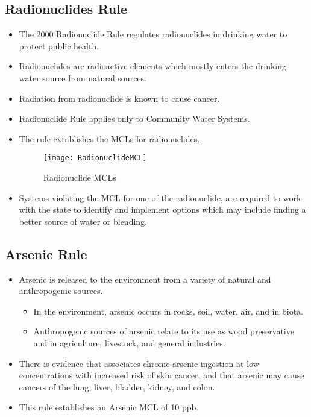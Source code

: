 \subsection{Radionuclides Rule}
\begin{itemize}
\item The 2000 Radionuclide Rule regulates radionuclides in drinking water to protect public health. 
\item Radionuclides are radioactive elements which mostly enters the drinking water source from natural sources.
\item Radiation from radionuclide is known to cause cancer.
\item Radionuclide Rule applies only to Community Water Systems.
\item The rule extablishes the MCLs for radionuclides.
\newpage
\begin{figure}[H]
\begin{center}
\texttt{[image: RadionuclideMCL]}
\caption{Radionuclide MCLs}
\end{center}
\end{figure}

\item Systems violating the MCL for one of the radionuclide, are required to work with the state to identify and implement options which may include finding a better source of water or blending.
\end{itemize}

\subsection{Arsenic Rule}
\begin{itemize}
\item Arsenic is released to the environment from a variety of natural and anthropogenic
sources. 
\begin{itemize}
\item In the environment, arsenic occurs in rocks, soil, water, air, and in biota.
\item Anthropogenic sources of arsenic relate to its use as wood preservative and in agriculture, livestock, and general industries. 
\end{itemize}
\item There is evidence that associates chronic arsenic ingestion at low concentrations with
increased risk of skin cancer, and that arsenic may cause cancers of the lung, liver, bladder,
kidney, and colon.
\item This rule establishes an Arsenic MCL of 10 ppb.

\end{itemize}
